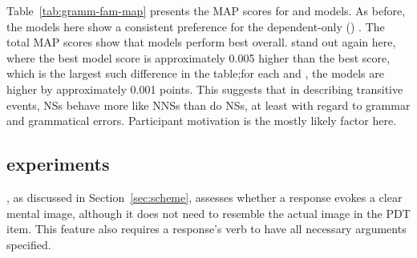 Table~\ref{tab:gramm-fam-map} presents the  MAP scores for  and  models. As before, the models here show a consistent preference for the dependent-only () . The total MAP scores show that  models perform best overall.  stand out again here, where the best  model score is approximately 0.005 higher than the best  score, which is the largest such difference in the table;for each  and , the  models are higher by approximately 0.001 points. This suggests that in describing transitive events,  NSs behave more like NNSs than do  NSs, at least with regard to grammar and grammatical errors. Participant motivation is the mostly likely factor here.

\subsection{ experiments}
\label{sec:map-interp}

, as discussed in Section~\ref{sec:scheme}, assesses whether a response evokes a clear mental image, although it does not need to resemble the actual image in the PDT item. This feature also requires a response's verb to have all necessary arguments specified.

